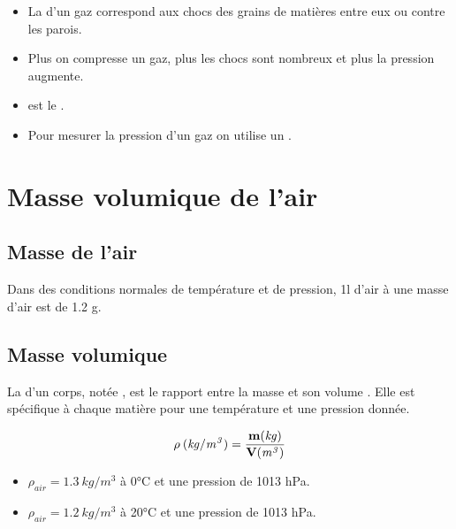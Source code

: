 \documentclass[xcolor={dvipsnames}]{beamer}
\begin{document}
\begin{frame}
\begin{mybilan}
	\begin{itemize}
		\item La  d'un gaz correspond aux chocs des grains de matières entre eux ou contre les parois.\pause
		\item Plus on compresse un gaz, plus les chocs sont nombreux et plus la pression augmente.\pause
		\item {} est le .\pause
		\item Pour mesurer la pression d'un gaz on utilise un .
		
	\end{itemize}
\end{mybilan}
\end{frame}
\section{Masse volumique de l'air}


\subsection{Masse de l'air}

\begin{frame}
\begin{mybilan}
	Dans des conditions normales de température et de pression, 1l d'air à une masse d'air est de \num{1.2} g.
\end{mybilan}
\end{frame}

\subsection{Masse volumique}

\begin{frame}
\begin{mybilan}
	La  d'un corps, notée \kw{$\rho$}, est le rapport entre la masse  et son volume . Elle est spécifique à chaque matière pour une température et une pression donnée.
	
	\begin{equation*}
	\mathbf{\rho} \: \mathit{{\small (kg/m^3)}} = \frac{\mathbf{m} \mathit{{\small (kg)}}}{\mathbf{V} \mathit{{\small (m^3)}}}
	\end{equation*}
\end{mybilan}\pause

\begin{myex}
	\begin{itemize}
		\item $\rho_{air}  = \num{1.3} \: kg/m^3$ à 0°C et une pression de \num{1013} hPa.
		\item $\rho_{air}  = \num{1.2} \: kg/m^3$ à 20°C et une pression de \num{1013} hPa.
	\end{itemize}
\end{myex}

\end{frame}
\end{document}
